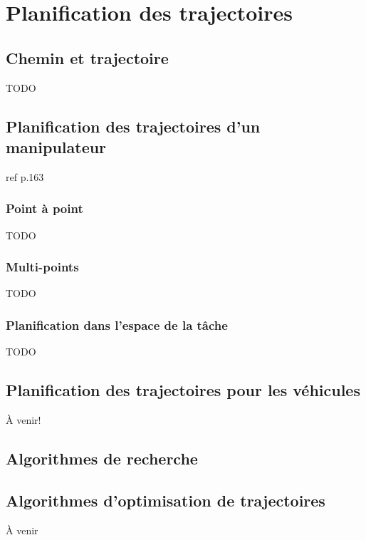\chapter{Planification des trajectoires}



\section{Chemin et trajectoire}
TODO

\section{Planification des trajectoires d'un manipulateur}

ref p.163

\subsection{Point à point}
TODO

\subsection{Multi-points}
TODO



\subsection{Planification dans l'espace de la tâche}
TODO


\section{Planification des trajectoires pour les véhicules}

À venir!

\section{Algorithmes de recherche}


\section{Algorithmes d'optimisation de trajectoires}


À venir